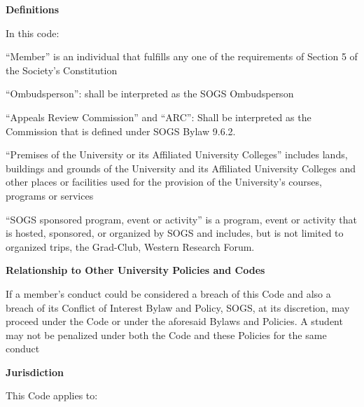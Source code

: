 \begin{longenum}[ label*=\arabic*., align=left]
\begin{longenum}[ label*=\arabic*., align=left]
     \end{longenum}
     \item \textbf{Definitions}
     
     In this code:
     \begin{longenum}[ label*=\arabic*., align=left]
     \item ``Member'' is an individual that fulfills any one of the requirements of Section 5 of the Society's 
Constitution
     \item ``Ombudsperson'': shall be interpreted as the SOGS Ombudsperson
     \item ``Appeals  Review  Commission''  and  ``ARC'':  Shall  be  interpreted  as  the  Commission  that  is defined under SOGS Bylaw 9.6.2.
     \item ``Premises  of  the  University  or  its  Affiliated  University  Colleges''  includes  lands,  buildings  and grounds of the University and its Affiliated University Colleges and other places or facilities used for the provision of the University’s courses, programs or services
     \item ``SOGS sponsored program, event or activity'' is a program, event or activity that  is hosted, sponsored,  or  organized  by  SOGS  and  includes,  but  is  not  limited  to  organized  trips,  the  Grad-Club, Western Research Forum.

     \end{longenum}
\item \textbf{Relationship to Other University Policies and Codes}
     \begin{longenum}[ label*=\arabic*., align=left]
           \item If a member's conduct could be considered a breach of this Code and also a breach of its Conflict  of  Interest  Bylaw  and  Policy, SOGS, at its discretion, may proceed under the Code or under the aforesaid Bylaws and Policies. A student may not be penalized under both the Code and these Policies for the same conduct
     \end{longenum}
\item \textbf{Jurisdiction}
     \begin{longenum}[ label*=\arabic*., align=left]
           \item This Code applies to:


\end{longenum}
\end{longenum}
